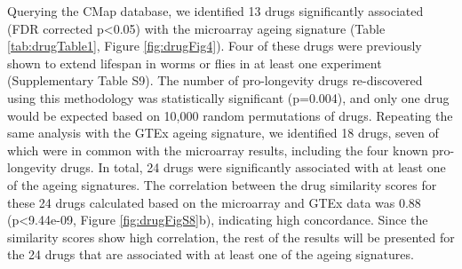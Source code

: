\documentclass[12pt,twoside]{unicam}
\begin{document}
Querying the CMap database, we identified 13 drugs significantly associated (FDR corrected p\textless0.05) with the microarray ageing signature (Table \ref{tab:drugTable1}, Figure \ref{fig:drugFig4}). Four of these drugs were previously shown to extend lifespan in worms or flies in at least one experiment (Supplementary Table S9). The number of pro-longevity drugs re-discovered using this methodology was statistically significant (p=0.004), and only one drug would be expected based on 10,000 random permutations of drugs. Repeating the same analysis with the GTEx ageing signature, we identified 18 drugs, seven of which were in common with the microarray results, including the four known pro-longevity drugs. In total, 24 drugs were significantly associated with at least one of the ageing signatures. The correlation between the drug similarity scores for these 24 drugs calculated based on the microarray and GTEx data was 0.88 (p\textless9.44e-09, Figure \ref{fig:drugFigS8}b), indicating high concordance. Since the similarity scores show high correlation, the rest of the results will be presented for the 24 drugs that are associated with at least one of the ageing signatures.
\end{document}
